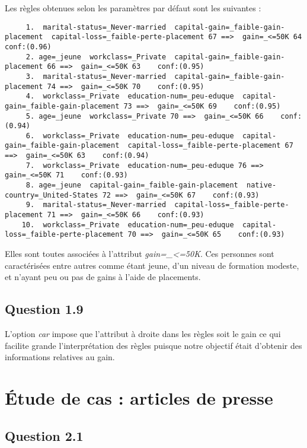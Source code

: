 \documentclass[a4paper,12pt]{article}
\begin{document}
Les règles obtenues selon les paramètres par défaut sont les suivantes :

\begin{lstlisting}
	 1.  marital-status=_Never-married  capital-gain=_faible-gain-placement  capital-loss=_faible-perte-placement 67 ==>  gain=_<=50K 64    conf:(0.96)
	 2. age=_jeune  workclass=_Private  capital-gain=_faible-gain-placement 66 ==>  gain=_<=50K 63    conf:(0.95)
	 3.  marital-status=_Never-married  capital-gain=_faible-gain-placement 74 ==>  gain=_<=50K 70    conf:(0.95)
	 4.  workclass=_Private  education-num=_peu-eduque  capital-gain=_faible-gain-placement 73 ==>  gain=_<=50K 69    conf:(0.95)
	 5. age=_jeune  workclass=_Private 70 ==>  gain=_<=50K 66    conf:(0.94)
	 6.  workclass=_Private  education-num=_peu-eduque  capital-gain=_faible-gain-placement  capital-loss=_faible-perte-placement 67 ==>  gain=_<=50K 63    conf:(0.94)
	 7.  workclass=_Private  education-num=_peu-eduque 76 ==>  gain=_<=50K 71    conf:(0.93)
	 8. age=_jeune  capital-gain=_faible-gain-placement  native-country=_United-States 72 ==>  gain=_<=50K 67    conf:(0.93)
	 9.  marital-status=_Never-married  capital-loss=_faible-perte-placement 71 ==>  gain=_<=50K 66    conf:(0.93)
	10.  workclass=_Private  education-num=_peu-eduque  capital-loss=_faible-perte-placement 70 ==>  gain=_<=50K 65    conf:(0.93)
\end{lstlisting}

Elles sont toutes associées à l'attribut \textit{gain=\_<=50K}.
Ces personnes sont caractérisées entre autres comme étant jeune, d'un niveau de formation modeste, et n'ayant peu ou pas de gains à l'aide de placements.


\subsection*{Question 1.9}

L'option \textit{car} impose que l'attribut à droite dans les règles soit le gain ce qui facilite grande l'interprétation des règles puisque notre objectif était d'obtenir des informations relatives au gain.



\section{\'Etude de cas : articles de presse}

\subsection*{Question 2.1}
\end{document}
